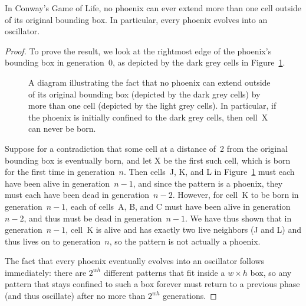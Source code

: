\begin{theorem}\label{thm:phoenix_oscillate}
	In Conway's Game of Life, no phoenix can ever extend more than one cell outside of its original bounding box. In particular, every phoenix evolves into an oscillator.
\end{theorem}
\begin{proof}
	To prove the result, we look at the rightmost edge of the phoenix's bounding box in generation~$0$, as depicted by the dark grey cells in Figure~\ref{fig:phoenix_proof_1}.
	
	\begin{figure}[!htb]
		\centering{}
		\caption{A diagram illustrating the fact that no phoenix can extend outside of its original bounding box (depicted by the dark grey cells) by more than one cell (depicted by the light grey cells). In particular, if the phoenix is initially confined to the dark grey cells, then cell~X can never be born.}\label{fig:phoenix_proof_1}
	\end{figure}
	
	Suppose for a contradiction that some cell at a distance of~2 from the original bounding box is eventually born, and let X be the first such cell, which is born for the first time in generation~$n$. Then cells~J, K, and L in Figure~\ref{fig:phoenix_proof_1} must each have been alive in generation~$n-1$, and since the pattern is a phoenix, they must each have been dead in generation~$n-2$. However, for cell~K to be born in generation~$n-1$, each of cells~A, B, and C must have been alive in generation~$n-2$, and thus must be dead in generation~$n-1$. We have thus shown that in generation~$n-1$, cell~K is alive and has exactly two live neighbors (J and L) and thus lives on to generation~$n$, so the pattern is not actually a phoenix.
	
	The fact that every phoenix eventually evolves into an oscillator follows immediately: there are $2^{wh}$ different patterns that fit inside a $w \times h$ box, so any pattern that stays confined to such a box forever must return to a previous phase (and thus oscillate) after no more than $2^{wh}$ generations.
\end{proof}

